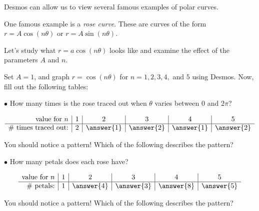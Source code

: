 \documentclass{ximera}
\author{Jim Talamo}
\begin{document}
\begin{exercise}
Desmos can allow us to view several famous examples of polar curves.

One famous example is a \emph{rose curve}.  These are curves of the form $r= A \cos(n \theta)$ or $r= A \sin(n \theta)$.

\begin{exercise}
Let's study what $r= a \cos(n \theta)$ looks like and examine the effect of the parameters $A$ and $n$.  

Set $A=1$, and graph $r=\cos(n \theta)$ for $n=1,2,3,4,$ and $5$ using Desmos.  Now, fill out the following tables:

$\bullet$ How many times is the rose traced out when $\theta$ varies between $0$ and $2 \pi$?

\[
\begin{array}{r|c|c|c|c|c}
\textrm{value for } n & 1 & 2 & 3 & 4 & 5 \\
\hline
\textrm{\# times traced out:} & 2 & \answer{1} & \answer{2} & \answer{1} & \answer{2}
\end{array}
\]

\begin{exercise}
You should notice a pattern! Which of the following describes the pattern?
\begin{multipleChoice}
\end{multipleChoice}
\end{exercise}

$\bullet$ How many petals does each rose have?

\[
\begin{array}{r|c|c|c|c|c}
\textrm{value for } n & 1 & 2 & 3 & 4 & 5 \\
\hline
\textrm{\# petals:} & 1 & \answer{4} & \answer{3} & \answer{8} & \answer{5}
\end{array}
\]

\begin{exercise}
You should notice a pattern! Which of the following describes the pattern?
\begin{multipleChoice}
\end{multipleChoice}
\end{exercise}


\end{exercise}
\end{exercise}
\end{document}
